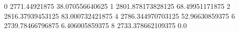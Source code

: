 0 2771.44921875 38.070556640625
1 2801.878173828125 68.49951171875
2 2816.37939453125 83.000732421875
4 2786.344970703125 52.96630859375
6 2739.78466796875 6.406005859375
8 2733.378662109375 0.0
